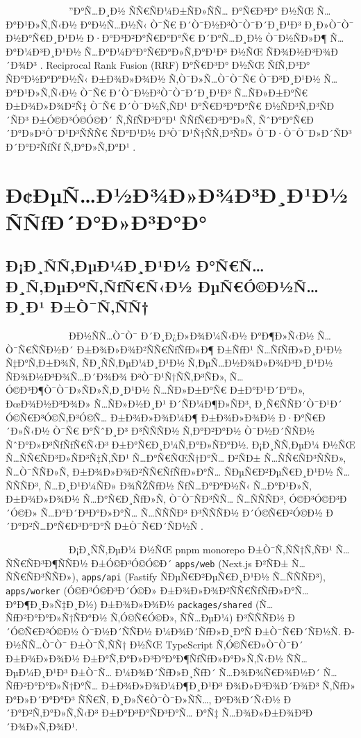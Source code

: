 \documentclass[12pt,A4]{report}
\begin{document}
\ \ \ \ \ \ \ \ \  \ \ \ \ \Ð”Ð°Ñ…Ð¸Ð½ ÑÑ€ÑÐ¼Ð±ÑÐ»ÑÑ… Ð°Ñ€Ð³Ð° Ð½ÑŒ Ñ…Ð°Ð¹Ð»Ñ‚Ñ‹Ð½
Ð°Ð½Ñ…Ð½Ñ‹ Ò¯Ñ€ Ð´Ò¯Ð½Ð³Ò¯Ò¯Ð´Ð¸Ð¹Ð³ Ð¸Ð»Ò¯Ò¯ Ð½Ð°Ñ€Ð¸Ð¹Ð½ Ð·Ð°Ð³Ð²Ð°Ñ€Ð°Ð°Ñ€ Ð´Ð°Ñ…Ð¸Ð½ Ò¯Ð½ÑÐ»Ð¶ Ñ…Ð°Ð¼Ð³Ð¸Ð¹Ð½
Ñ…Ð°Ð¼Ð°Ð°Ñ€Ð°Ð»Ñ‚Ð°Ð¹Ð³ Ð½ÑŒ ÑÐ¾Ð½Ð³Ð¾Ð´Ð¾Ð³ \cite{nogueira2019passage}. Reciprocal Rank
Fusion (RRF) Ð°Ñ€Ð³Ð° Ð½ÑŒ ÑƒÑ‚Ð³Ð° ÑÐ°Ð½Ð°Ð°Ð½Ñ‹ Ð±Ð¾Ð»Ð¾Ð½ Ñ‚Ò¯Ð»Ñ…Ò¯Ò¯Ñ€ Ò¯Ð³Ð¸Ð¹Ð½ Ñ…Ð°Ð¹Ð»Ñ‚Ñ‹Ð½
Ò¯Ñ€ Ð´Ò¯Ð½Ð³Ò¯Ò¯Ð´Ð¸Ð¹Ð³ Ñ…ÑÐ»Ð±Ð°Ñ€ Ð±Ð¾Ð»Ð¾Ð²Ñ‡ Ò¯Ñ€ Ð´Ò¯Ð½Ñ‚ÑÐ¹ Ð°Ñ€Ð³Ð°Ð°Ñ€ Ð½ÑÐ³Ñ‚Ð³ÑÐ´ÑÐ³ Ð±Ó©Ð³Ó©Ó©Ð´
Ñ‚ÑƒÑÐ³Ð°Ð¹ ÑÑƒÑ€Ð³Ð°Ð»Ñ‚ ÑˆÐ°Ð°Ñ€Ð´Ð°Ð»Ð³Ò¯Ð¹Ð³ÑÑÑ€ ÑÐ°Ð¹Ð½ Ð³Ò¯Ð¹Ñ†ÑÑ‚Ð³ÑÐ» Ò¯Ð·Ò¯Ò¯Ð»Ð´ÑÐ³ Ð´Ð°Ð²ÑƒÑƒ Ñ‚Ð°Ð»Ñ‚Ð°Ð¹
\cite{cormack2009reciprocal}.

\clearpage
\chapter{Ð¢ÐµÑ…Ð½Ð¾Ð»Ð¾Ð³Ð¸Ð¹Ð½ ÑÑƒÐ´Ð°Ð»Ð³Ð°Ð°}
\markboth{}{}
\pagestyle{fancyplain}

\section{Ð¡Ð¸ÑÑ‚ÐµÐ¼Ð¸Ð¹Ð½ Ð°Ñ€Ñ…Ð¸Ñ‚ÐµÐºÑ‚ÑƒÑ€Ñ‹Ð½ ÐµÑ€Ó©Ð½Ñ…Ð¸Ð¹ Ð±Ò¯Ñ‚ÑÑ†}

\ \ \ \ \ \ \ \ \  \ \ \ \ Ð­Ð½ÑÑ…Ò¯Ò¯ Ð´Ð¸Ð¿Ð»Ð¾Ð¼Ñ‹Ð½ Ð°Ð¶Ð»Ñ‹Ð½ Ñ…Ò¯Ñ€ÑÑÐ½Ð´ Ð±Ð¾Ð»Ð¾Ð²ÑÑ€ÑƒÑƒÐ»Ð¶ Ð±ÑƒÐ¹
Ñ…ÑƒÑƒÐ»Ð¸Ð¹Ð½ Ñ‡Ð°Ñ‚Ð±Ð¾Ñ‚ ÑÐ¸ÑÑ‚ÐµÐ¼Ð¸Ð¹Ð½ Ñ‚ÐµÑ…Ð½Ð¾Ð»Ð¾Ð³Ð¸Ð¹Ð½ ÑÐ¾Ð½Ð³Ð¾Ñ…Ð´Ð¾Ð¾ Ð³Ò¯Ð¹Ñ†ÑÑ‚Ð³ÑÐ»,
Ñ…Ó©Ð³Ð¶Ò¯Ò¯Ð»ÑÐ»Ñ‚Ð¸Ð¹Ð½ Ñ…ÑÐ»Ð±Ð°Ñ€ Ð±Ð°Ð¹Ð´Ð°Ð», ÐœÐ¾Ð½Ð³Ð¾Ð» Ñ…ÑÐ»Ð½Ð¸Ð¹ Ð´ÑÐ¼Ð¶Ð»ÑÐ³, Ð¸Ñ€ÑÑÐ´Ò¯Ð¹Ð´ Ó©Ñ€Ð³Ó©Ñ‚Ð³Ó©Ñ…
Ð±Ð¾Ð»Ð¾Ð¼Ð¶ Ð±Ð¾Ð»Ð¾Ð½ Ð·Ð°Ñ€Ð´Ð»Ñ‹Ð½ Ò¯Ñ€ Ð°ÑˆÐ¸Ð³ Ð³ÑÑÑÐ½ Ñ‚Ð°Ð²Ð°Ð½ Ò¯Ð½Ð´ÑÑÐ½ ÑˆÐ°Ð»Ð³ÑƒÑƒÑ€Ñ‹Ð³ Ð±Ð°Ñ€Ð¸Ð¼Ñ‚Ð°Ð»ÑÐ°Ð½.
Ð¡Ð¸ÑÑ‚ÐµÐ¼ Ð½ÑŒ Ñ…ÑÑ€ÑÐ³Ð»ÑÐ³Ñ‡Ñ‚ÑÐ¹ Ñ…Ð°Ñ€ÑŒÑ†Ð°Ñ… Ð²ÑÐ± Ñ…ÑÑ€ÑÐ³ÑÑÐ», Ñ…Ò¯ÑÑÐ»Ñ‚ Ð±Ð¾Ð»Ð¾Ð²ÑÑ€ÑƒÑƒÐ»Ð°Ñ… ÑÐµÑ€Ð²ÐµÑ€Ð¸Ð¹Ð½
Ñ…ÑÑÑÐ³, Ñ…Ð¸Ð¹Ð¼ÑÐ» Ð¾ÑŽÑƒÐ½ ÑƒÑ…Ð°Ð°Ð½Ñ‹ Ñ…Ð°Ð¹Ð»Ñ‚ Ð±Ð¾Ð»Ð¾Ð½ Ñ…Ð°Ñ€Ð¸ÑƒÐ»Ñ‚ Ò¯Ò¯ÑÐ³ÑÑ… Ñ…ÑÑÑÐ³, Ó©Ð³Ó©Ð³Ð´Ó©Ð»
Ñ…Ð°Ð´Ð³Ð°Ð»Ð°Ñ… Ñ…ÑÑÑÐ³ Ð³ÑÑÑÐ½ Ð´Ó©Ñ€Ð²Ó©Ð½ Ð´Ð°Ð²Ñ…Ð°Ñ€Ð³Ð°Ð°Ñ Ð±Ò¯Ñ€Ð´ÑÐ½Ñ \cite{richards2020fundamentals}.

\ \ \ \ \ \ \ \ \  \ \ \ \ Ð¡Ð¸ÑÑ‚ÐµÐ¼ Ð½ÑŒ pnpm monorepo Ð±Ò¯Ñ‚ÑÑ†Ñ‚ÑÐ¹
Ñ…ÑÑ€ÑÐ³Ð¶ÑÑÐ½ Ð±Ó©Ð³Ó©Ó©Ð´ \texttt{apps/web} (Next.js Ð²ÑÐ± Ñ…ÑÑ€ÑÐ³ÑÑÐ»),
\texttt{apps/api} (Fastify ÑÐµÑ€Ð²ÐµÑ€Ð¸Ð¹Ð½ Ñ…ÑÑÑÐ³), \texttt{apps/worker}
(Ó©Ð³Ó©Ð³Ð´Ó©Ð» Ð±Ð¾Ð»Ð¾Ð²ÑÑ€ÑƒÑƒÐ»Ð°Ñ… Ð°Ð¶Ð¸Ð»Ñ‡Ð¸Ð½) Ð±Ð¾Ð»Ð¾Ð½ \texttt{packages/shared}
(Ñ…ÑƒÐ²Ð°Ð°Ð»Ñ†ÑÐ°Ð½ Ñ‚Ó©Ñ€Ó©Ð», ÑÑ…ÐµÐ¼) Ð³ÑÑÑÐ½ Ð´Ó©Ñ€Ð²Ó©Ð½ Ò¯Ð½Ð´ÑÑÐ½ Ð¼Ð¾Ð´ÑƒÐ»Ð¸Ð°Ñ Ð±Ò¯Ñ€Ð´ÑÐ½Ñ.
Ð­Ð½ÑÑ…Ò¯Ò¯ Ð±Ò¯Ñ‚ÑÑ† Ð½ÑŒ TypeScript Ñ‚Ó©Ñ€Ð»Ò¯Ò¯Ð´ Ð±Ð¾Ð»Ð¾Ð½ Ð±Ð°Ñ‚Ð°Ð»Ð³Ð°Ð°Ð¶ÑƒÑƒÐ»Ð°Ð»Ñ‚Ñ‹Ð½ ÑÑ…ÐµÐ¼Ð¸Ð¹Ð³
Ð±Ò¯Ñ… Ð¼Ð¾Ð´ÑƒÐ»Ð¸ÑƒÐ´ Ñ…Ð¾Ð¾Ñ€Ð¾Ð½Ð´ Ñ…ÑƒÐ²Ð°Ð°Ð»Ñ†Ð°Ñ… Ð±Ð¾Ð»Ð¾Ð¼Ð¶Ð¸Ð¹Ð³ Ð¾Ð»Ð³Ð¾Ð´Ð¾Ð³ Ñ‚ÑƒÐ» Ð°Ð»Ð´Ð°Ð°Ð³
ÑÑ€Ñ‚ Ð¸Ð»Ñ€Ò¯Ò¯Ð»ÑÑ…, ÐºÐ¾Ð´Ñ‹Ð½ Ð´Ð°Ð²Ñ‚Ð°Ð»Ñ‚Ñ‹Ð³ Ð±Ð°Ð³Ð°ÑÐ³Ð°Ñ… Ð°Ñ‡ Ñ…Ð¾Ð»Ð±Ð¾Ð³Ð´Ð¾Ð»Ñ‚Ð¾Ð¹.
\end{document}

